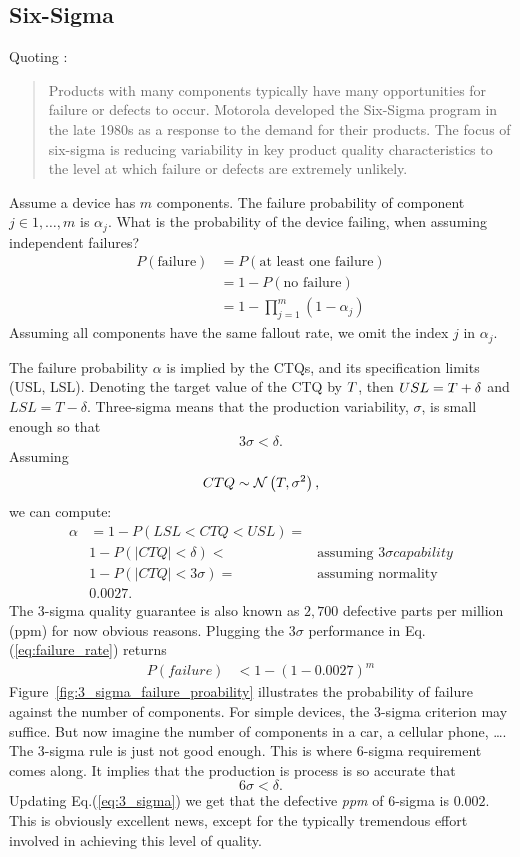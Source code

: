 \subsection{Six-Sigma}
\label{sec:six_sigma}

Quoting \cite{montgomery_introduction_2007}:
\begin{quote}
Products with many components typically have many opportunities for failure or defects to occur. Motorola developed the Six-Sigma program in the late 1980s as a response to the demand for their products. The focus of six-sigma is reducing variability in key product quality characteristics to the level at which failure or defects are extremely unlikely.
\end{quote}

Assume a device has $m$ components. 
The failure probability of component $j \in 1,\dots,m$ is $\alpha_j$.
What is the probability of the device failing, when assuming independent failures?
\begin{align}
\label{eq:failure_rate}
	P(\text{failure}) &= P(\text{at least one failure}) \\ \nonumber
	&= 1-P(\text{no failure}) \\ \nonumber
	&= 1-\prod_{j=1}^{m}(1-\alpha_j) 
\end{align}
Assuming all components have the same fallout rate, we omit the index $j$ in $\alpha_j$. 

The failure probability $\alpha$ is implied by the CTQs, and its specification limits (USL, LSL). 
Denoting the target value of the CTQ by $T$, then $USL=T + \delta$ and $LSL=T-\delta$.
Three-sigma means that the production variability, $\sigma$, is small enough so that $$3 \sigma < \delta.$$
Assuming $$CTQ \sim \mathcal{N}\left(T, \sigma^2\right),$$ we can compute:
\begin{align}
\label{eq:3_sigma}
	\alpha & = 1-P(LSL<CTQ<USL) = & \\ 
	& 1-P(|CTQ| < \delta) < & \text{assuming } 3\sigma capability\\ 
	& 1- P(|CTQ| < 3 \sigma ) = & \text{assuming normality} \\ 
	& 0.0027 .&
\end{align}
The 3-sigma quality guarantee is also known as $2,700$ defective parts per million (ppm) for now obvious reasons.
Plugging the $3\sigma$ performance in Eq.(\ref{eq:failure_rate}) returns
\begin{align*}
	P(failure) &< 1-(1-0.0027)^m
\end{align*}
Figure~\ref{fig:3_sigma_failure_proability} illustrates the probability of failure against the number of components. 
For simple devices, the 3-sigma criterion may suffice. 
But now imagine the number of components in a car, a cellular phone, \dots. The 3-sigma rule is just not good enough. 
This is where 6-sigma requirement comes along. It implies that the production is process is so accurate that 
$$6 \sigma < \delta.$$
Updating Eq.(\ref{eq:3_sigma}) we get that the defective \emph{ppm} of 6-sigma is $0.002$. 
This is obviously excellent news, except for the typically tremendous effort involved in achieving this level of quality.

